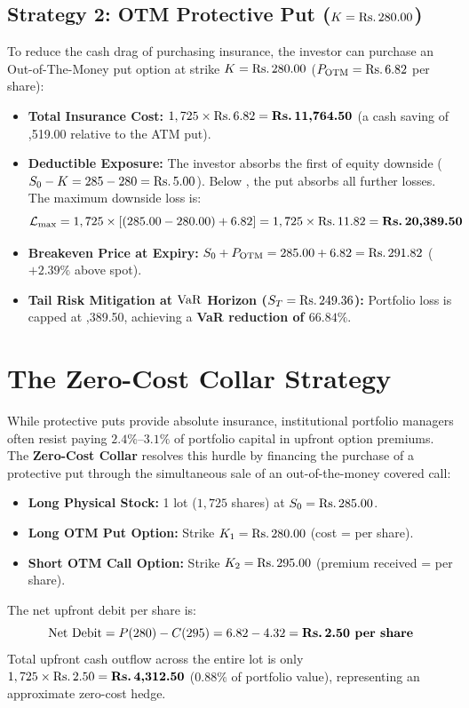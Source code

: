 \subsection{Strategy 2: OTM Protective Put ($K = \text{\text{Rs.}\,}280.00$)}

To reduce the cash drag of purchasing insurance, the investor can purchase an Out-of-The-Money put option at strike $K = \text{\text{Rs.}\,}280.00$ ($P_{\text{OTM}} = \text{\text{Rs.}\,}6.82$ per share):
\begin{itemize}
    \item \textbf{Total Insurance Cost:} $1,725 \times \text{\text{Rs.}\,}6.82 = \text{\textbf{\text{Rs.}\,11,764.50}}$ (a cash saving of ,519.00 relative to the ATM put).
    \item \textbf{Deductible Exposure:} The investor absorbs the first  of equity downside ($S_0 - K = 285 - 280 = \text{\text{Rs.}\,}5.00$). Below , the put absorbs all further losses. The maximum downside loss is:
    \begin{equation}
    \mathcal{L}_{\max} = 1,725 \times \left[(285.00 - 280.00) + 6.82\right] = 1,725 \times \text{\text{Rs.}\,}11.82 = \text{\textbf{\text{Rs.}\,20,389.50}}
    \end{equation}
    \item \textbf{Breakeven Price at Expiry:} $S_0 + P_{\text{OTM}} = 285.00 + 6.82 = \text{\text{Rs.}\,291.82}$ ($+2.39\%$ above spot).
    \item \textbf{Tail Risk Mitigation at $\operatorname{VaR}$ Horizon ($S_T = \text{\text{Rs.}\,}249.36$):} Portfolio loss is capped at ,389.50, achieving a \textbf{VaR reduction of $66.84\%$}.
\end{itemize}

\section{The Zero-Cost Collar Strategy}
\label{sec:collar_strategy}

While protective puts provide absolute insurance, institutional portfolio managers often resist paying $2.4\%\text{--}3.1\%$ of portfolio capital in upfront option premiums. The \textbf{Zero-Cost Collar} resolves this hurdle by financing the purchase of a protective put through the simultaneous sale of an out-of-the-money covered call:
\begin{itemize}
    \item \textbf{Long Physical Stock:} 1 lot ($1,725$ shares) at $S_0 = \text{\text{Rs.}\,}285.00$.
    \item \textbf{Long OTM Put Option:} Strike $K_1 = \text{\text{Rs.}\,}280.00$ (cost =  per share).
    \item \textbf{Short OTM Call Option:} Strike $K_2 = \text{\text{Rs.}\,}295.00$ (premium received =  per share).
\end{itemize}
The net upfront debit per share is:
\begin{equation}
\text{Net Debit} = P(280) - C(295) = 6.82 - 4.32 = \text{\textbf{\text{Rs.}\,2.50 per share}}
\end{equation}
Total upfront cash outflow across the entire lot is only $1,725 \times \text{\text{Rs.}\,}2.50 = \text{\textbf{\text{Rs.}\,4,312.50}}$ ($0.88\%$ of portfolio value), representing an approximate zero-cost hedge.

